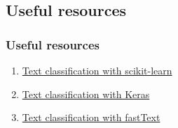 \documentclass{beamer}
\begin{document}
\subsection{Useful resources}
\begin{frame}
    \frametitle{Useful resources}
    \begin{enumerate}
        \item     \href{https://scikit-learn.org/stable/tutorial/text_analytics/working_with_text_data.html}{Text classification with scikit-learn}
        \item \href{https://keras.io/examples/nlp/text_classification_from_scratch/}{Text classification with Keras}
        \item \href{https://fasttext.cc/docs/en/supervised-tutorial.html}{Text classification with fastText}
    \end{enumerate}
    
\end{frame}

%
%

%    
\end{document}
